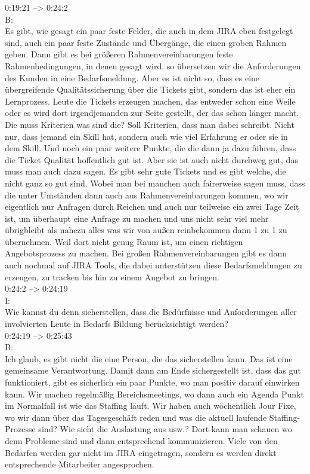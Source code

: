 0:19:21 --> 0:24:2\\
B:\\
Es gibt, wie gesagt ein paar feste Felder, die auch in dem JIRA eben festgelegt sind, auch ein paar feste Zustände und Übergänge, die einen groben Rahmen geben. Dann gibt es bei größeren Rahmenvereinbarungen feste Rahmenbedingungen, in denen gesagt wird, so übersetzen wir die Anforderungen des Kunden in eine Bedarfsmeldung. Aber es ist nicht so, dass es eine übergreifende Qualitätssicherung über die Tickets gibt, sondern das ist eher ein Lernprozess. Leute die Tickets erzeugen machen, das entweder schon eine Weile oder es wird dort irgendjemanden zur Seite gestellt, der das schon länger macht. Die muss Kriterien was sind die? Soll Kriterien, dass man dabei schreibt. Nicht nur, dass jemand ein Skill hat, sondern auch wie viel Erfahrung er oder sie in dem Skill. Und noch ein paar weitere Punkte, die die dann ja dazu führen, dass die Ticket Qualität hoffentlich gut ist. Aber sie ist auch nicht durchweg gut, das muss man auch dazu sagen. Es gibt sehr gute Tickets und es gibt welche, die nicht ganz so gut sind. Wobei man bei manchen auch fairerweise sagen muss, dass die unter Umständen dann auch aus Rahmenvereinbarungen kommen, wo wir eigentlich nur Anfragen durch Reichen und auch nur teilweise ein zwei Tage Zeit ist, um überhaupt eine Anfrage zu machen und uns nicht sehr viel mehr übrigbleibt als nahezu alles was wir von außen reinbekommen dann 1 zu 1 zu übernehmen. Weil dort nicht genug Raum ist, um einen richtigen Angebotsprozess zu machen. Bei großen Rahmenvereinbarungen gibt es dann auch nochmal auf JIRA Tools, die dabei unterstützen diese Bedarfsmeldungen zu erzeugen, zu tracken bis hin zu einem Angebot zu bringen.\\

0:24:2 --> 0:24:19\\
I:\\
Wie kannst du denn sicherstellen, dass die Bedürfnisse und Anforderungen aller involvierten Leute in Bedarfs Bildung berücksichtigt werden?\\

0:24:19 --> 0:25:43\\
B:\\
Ich glaub, es gibt nicht die eine Person, die das sicherstellen kann. Das ist eine gemeinsame Verantwortung. Damit dann am Ende sichergestellt ist, dass das gut funktioniert, gibt es sicherlich ein paar Punkte, wo man positiv darauf einwirken kann. Wir machen regelmäßig Bereichsmeetings, wo dann auch ein Agenda Punkt im Normalfall ist wie das Staffing läuft. Wir haben auch wöchentlich Jour Fixe, wo wir dann über das Tagesgeschäft reden und was die aktuell laufende Staffing-Prozesse sind? Wie sieht die Auslastung aus usw.? Dort kann man schauen wo denn Probleme sind und dann entsprechend kommunizieren. Viele von den Bedarfen werden gar nicht im JIRA eingetragen, sondern es werden direkt entsprechende Mitarbeiter angesprochen.\\
\newpage
